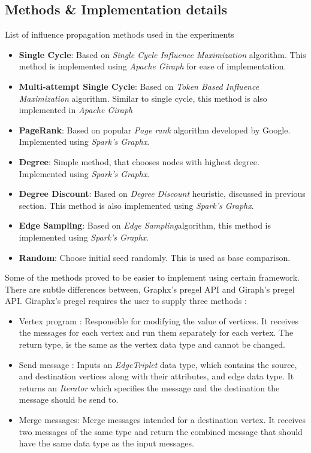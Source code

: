 \documentclass[english]{tktltiki}
\begin{document}
\subsection{Methods \& Implementation details}
List of influence propagation methods used in the experiments
\begin{itemize}
\item \textbf{Single Cycle}: Based on \textit{Single Cycle Influence Maximization} algorithm. This method is implemented using \textit{Apache Giraph} for ease of implementation.
\item \textbf{Multi-attempt Single Cycle}: Based on \textit{Token Based Influence Maximization} algorithm. Similar to single cycle, this method is also implemented in \textit{Apache Giraph}
\item \textbf{PageRank}: Based on popular \textit{Page rank} algorithm developed by Google. Implemented using \textit{Spark's Graphx}.
\item \textbf{Degree}: Simple method, that chooses nodes with highest degree. Implemented using \textit{Spark's Graphx}.
\item \textbf{Degree Discount}: Based on \textit{Degree Discount} heuristic, discussed in previous section. This method is also implemented using \textit{Spark's Graphx}.
\item \textbf{Edge Sampling}: Based on \textit{Edge Sampling}algorithm, this method is implemented using \textit{Spark's Graphx}.
\item \textbf{Random}: Choose initial seed randomly. This is used as base comparison. 
\end{itemize}

Some of the methods proved to be easier to implement using certain framework. There are subtle differences between, Graphx's pregel API and Giraph's pregel API. Giraphx's pregel requires the user to supply three methods : 
\begin{itemize}
\item Vertex program : Responsible for modifying the value of vertices. It receives the messages for each vertex and run them separately for each vertex. The return type, is the same as the vertex data type and cannot be changed.
\item Send message : Inputs an \textit{EdgeTriplet} data type, which contains the source, and destination vertices along with their attributes, and edge data type. It returns an \textit{Iterator} which specifies the message and the destination the message should be send to.
\item Merge messages: Merge messages intended for a destination vertex. It receives two messages of the same type and return the combined message that should have the same data type as the input messages.
\end{itemize}
\end{document}
